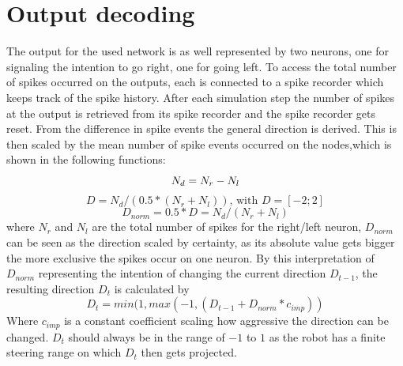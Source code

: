 \section{Output decoding}\label{sec:OutputDecoding}
The output for the used network is as well represented by two neurons, one for signaling the intention to go right, one for going left. To access the total number of spikes occurred on the outputs, each is connected to a spike recorder which keeps track of the spike history.
After each simulation step the number of spikes at the output is retrieved from its spike recorder and the spike recorder gets reset. From the difference in spike events the general direction is derived. This is then scaled by the mean number of spike events occurred on the nodes,which is shown in the following functions:
\begin{equation}
  N_d = N_r - N_l \\
\end{equation}
\begin{equation}
  D = N_d / (0.5 * (N_r + N_l)) \text{, with $D=[-2;2]$} 
\end{equation}
\begin{equation}
  D_{norm} = 0.5 * D = N_d/(N_r+N_l) 
\end{equation}
where $N_r$ and $N_l$ are the total number of spikes for the right/left neuron, $D_{norm}$ can be seen as the direction scaled by certainty, as its absolute value gets bigger the more exclusive the spikes occur on one neuron. By this interpretation of $D_{norm}$ representing the intention of changing the current direction $D_{t-1}$, the resulting direction $D_t$ is calculated by 
\label{eg:OutputCalc}
\begin{equation}
  D_t = min(1,max(-1,( D_{t-1} + D_{norm} * c_{imp}))
\end{equation}
Where $c_{imp}$ is a constant coefficient scaling how aggressive the direction can be changed. $D_t$ should always be in the range of $-1$ to $1$ as the robot has a finite steering range on which $D_t$ then gets projected.

